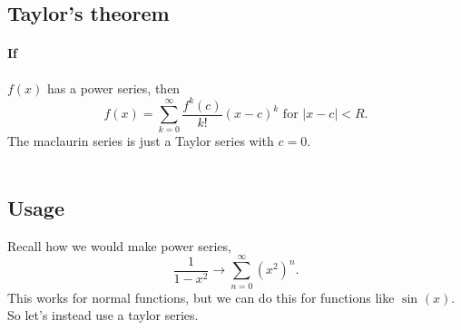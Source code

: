 \documentclass[a4paper]{article}
\begin{document}
\subsection*{Taylor's theorem}%
\label{sub:Taylor's theorem}
\paragraph{If} $ f\left( x \right)  $ has a power series, then 
\[
f\left( x \right)=\sum_{ k=0 } ^{ \infty } \frac{ f^{ k }\left( c \right)  }{ k! }\left( x-c \right) ^{ k } \text{ for } \left| x-c \right|<R
.\] 
The maclaurin series is just a Taylor series with $ c=0 $. \\ \\

\subsection*{Usage}%
\label{sub:Usage}
Recall how we would make power series,
\[
\frac{ 1 }{ 1-x^2 } \to \sum_{ n=0 } ^{ \infty } \left( x^2 \right) ^{ n }
.\] 
This works for normal functions, but we can do this for functions like $ \sin^{  } \left( x \right)  $. So let's instead use a taylor series.\\ \\
\end{document}
